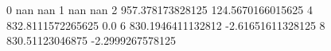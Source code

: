 0 nan nan
1 nan nan
2 957.378173828125 124.5670166015625
4 832.8111572265625 0.0
6 830.1946411132812 -2.61651611328125
8 830.51123046875 -2.2999267578125
